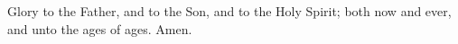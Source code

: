 Glory to the Father, and to the Son, and to the Holy Spirit; both now and ever, and unto the ages of ages. Amen.
